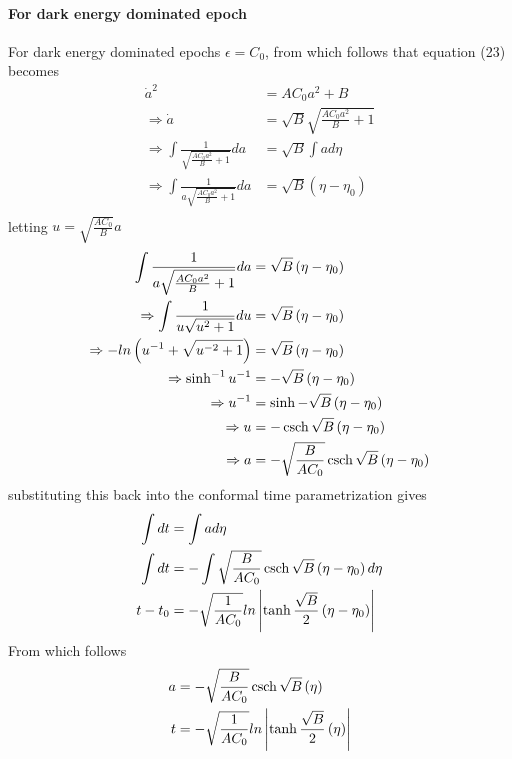 \documentclass[a4paper, 11pt]{FSKH_623_Report}
\numberwithin{equation}{section}
\newcommand{\brac}[1]{\left(#1\right)}
\begin{document}
\paragraph*{For dark energy dominated epoch}
For dark energy dominated epochs $\epsilon=C_{0}$, from which follows that equation (23) becomes
\begin{equation}
\begin{split}
\dot{a}^{2} &= AC_{0}a^{2}+B\\
\Rightarrow \dot{a} &= \sqrt{B}\sqrt{\frac{AC_{0}a^{2}}{B}+1}\\
\Rightarrow \int\frac{1}{\sqrt{\frac{AC_{0}a^{2}}{B}+1}}da &= \sqrt{B}\int ad\eta \\
\Rightarrow \int\frac{1}{a\sqrt{\frac{AC_{0}a^{2}}{B}+1}}da &= \sqrt{B}\brac{\eta-\eta_{0}} \\
\end{split}
\end{equation}
letting $u=\sqrt{\frac{AC_{0}}{B}}a$
\begin{equation}
\begin{split}
\int\frac{1}{a\sqrt{\frac{AC_{0}a^{2}}{B}+1}}da &= \sqrt{B}\brac{\eta-\eta_{0}} \\
\Rightarrow \int\frac{1}{u\sqrt{u^{2}+1}}du &= \sqrt{B}\brac{\eta-\eta_{0}} \\
\Rightarrow -ln\brac{u^{-1}+\sqrt{u^{-2}+1}} &= \sqrt{B}\brac{\eta-\eta_{0}} \\
\Rightarrow \sinh^{-1}u^{-1} &= -\sqrt{B}\brac{\eta-\eta_{0}} \\
\Rightarrow u^{-1} &= \sinh-\sqrt{B}\brac{\eta-\eta_{0}} \\
\Rightarrow u &= -\csch\sqrt{B}\brac{\eta-\eta_{0}} \\
\Rightarrow a &= -\sqrt{\frac{B}{AC_{0}}}\csch\sqrt{B}\brac{\eta-\eta_{0}} \\
\end{split}
\end{equation}
substituting this back into the conformal time parametrization gives
\begin{equation}
\begin{split}
\int dt &= \int ad\eta\\
\int dt &= -\int\sqrt{\frac{B}{AC_{0}}}\csch\sqrt{B}\brac{\eta-\eta_{0}} d\eta\\
t-t_{0} &= -\sqrt{\frac{1}{AC_{0}}}ln\left|\tanh\frac{\sqrt{B}}{2}\brac{\eta-\eta_{0}}\right| \\
\end{split}
\end{equation}
From which follows
\begin{equation}
\begin{split}
a &= -\sqrt{\frac{B}{AC_{0}}}\csch\sqrt{B}\brac{\eta} \\
t &= -\sqrt{\frac{1}{AC_{0}}}ln\left|\tanh\frac{\sqrt{B}}{2}\brac{\eta}\right| \\
\end{split}
\end{equation}
\end{document}

